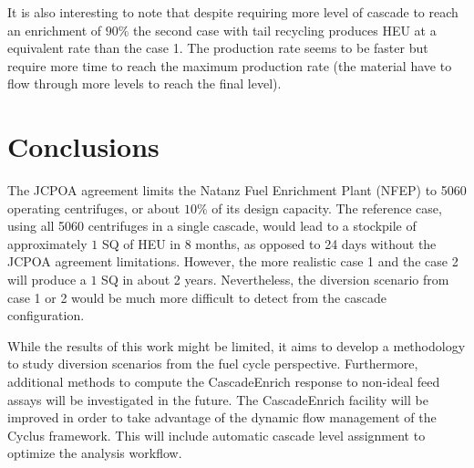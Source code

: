 \documentclass{anstrans}
\begin{document}
It is also interesting to note that despite requiring more level of cascade to
reach an enrichment of $90\%$ the second case with tail recycling produces HEU
at a equivalent rate than the case 1. The production rate seems to be faster but
require more time to reach the maximum production rate (the material have to
flow through more levels to reach the final level).


\section{Conclusions}

The JCPOA agreement limits the Natanz Fuel Enrichment Plant (NFEP) to 5060
operating centrifuges, or about $10\%$ of its design capacity. The reference
case, using all 5060 centrifuges in a single cascade, would lead to a stockpile
of approximately $1$ SQ of HEU in 8 months, as opposed to 24 days without the
JCPOA agreement limitations. However, the more realistic case 1 and the case 2
will produce a $1$ SQ in about 2 years. Nevertheless, the diversion scenario
from case 1 or 2 would be much more difficult to detect from the cascade
configuration.

While the results of this work might be limited, it aims to develop a
methodology to study diversion scenarios from the fuel cycle perspective.
Furthermore, additional methods to compute the CascadeEnrich response to
non-ideal feed assays will be investigated in the future.  The CascadeEnrich
facility will be improved in order to take advantage of the dynamic flow
management of the Cyclus framework. This will include automatic cascade level
assignment to optimize the analysis workflow.
\end{document}
